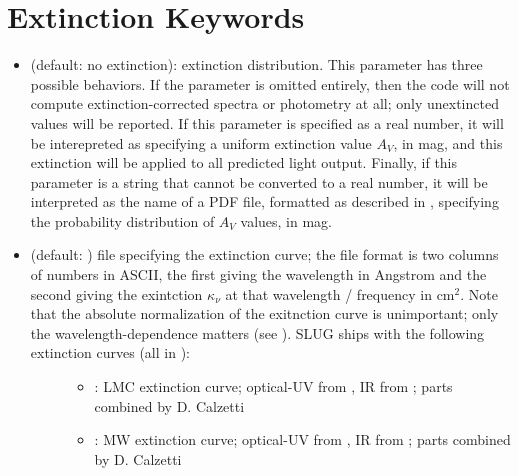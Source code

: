 \documentclass[letterpaper,10pt,english]{sphinxmanual}
\begin{document}
\section{Extinction Keywords}
\label{\detokenize{parameters:extinction-keywords}}\label{\detokenize{parameters:ssec-extinction-keywords}}\begin{itemize}
\item {} 
 (default: no extinction): extinction distribution. This parameter has three possible behaviors. If the parameter  is omitted entirely, then the code will not compute extinction-corrected spectra or photometry at all; only unextincted values will be reported. If this parameter is specified as a real number, it will be interepreted as specifying a uniform extinction value \(A_V\), in mag, and this extinction will be applied to all predicted light output. Finally, if this parameter is a string that cannot be converted to a real number, it will be interpreted as the name of a PDF file, formatted as described in {\hyperref[\detokenize{pdfs:sec-pdfs}]{}}, specifying the probability distribution of \(A_V\) values, in mag.

\item {} \begin{description}
\item[{ (default: ) file specifying the extinction curve; the file format is two columns of numbers in ASCII, the first giving the wavelength in Angstrom and the second giving the exintction \(\kappa_\nu\) at that wavelength / frequency in \(\mathrm{cm}^2\). Note that the absolute normalization of the exitnction curve is unimportant; only the wavelength-dependence matters (see {\hyperref[\detokenize{intro:ssec-spec-phot}]{}}). SLUG ships with the following extinction curves (all in ):}] \leavevmode\begin{itemize}
\item {} 
 : LMC extinction curve; optical-UV from , IR from ; parts combined by D. Calzetti

\item {} 
 : MW extinction curve; optical-UV from , IR from ; parts combined by D. Calzetti


\end{itemize}
\end{description}
\end{itemize}
\end{document}
